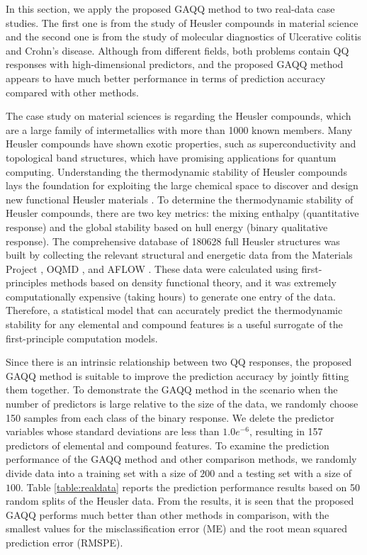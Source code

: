\documentclass[12pt]{article}
\begin{document}
In this section, we apply the proposed GAQQ method to two real-data case studies.
The first one is from the study of Heusler compounds in material science and the second one is from the study of molecular diagnostics of Ulcerative colitis and Crohn's disease.
Although from different fields, both problems contain QQ responses with high-dimensional predictors, and the proposed GAQQ method appears to have much better performance in terms of prediction accuracy compared with other methods.

The case study on material sciences is regarding the Heusler compounds, which are a large family of intermetallics with more than 1000 known members.
Many Heusler compounds have shown exotic properties, such as superconductivity and topological band structures, which have promising applications for quantum computing.
Understanding the thermodynamic stability of Heusler compounds lays the foundation for exploiting the large chemical space to discover and design new functional Heusler materials \citep{liu2016observation}.
To determine the thermodynamic stability of Heusler compounds, there are two key metrics: the mixing enthalpy (quantitative response) and the global stability based on hull energy (binary qualitative response).
The comprehensive database of 180628 full Heusler structures was built by collecting the relevant structural and energetic data from the Materials Project \citep{jain2013commentary}, OQMD \citep{saal2013materials}, and AFLOW \citep{curtarolo2012aflow}.
These data were calculated using first-principles methods based on density functional theory, and it was extremely computationally expensive (taking hours) to generate one entry of the data.
Therefore, a statistical model that can accurately predict the thermodynamic stability for any elemental and compound features is a useful surrogate of the first-principle computation models.

Since there is an intrinsic relationship between two QQ responses, the proposed GAQQ method is suitable to improve the prediction accuracy by jointly fitting them together.
To demonstrate the GAQQ method in the scenario when the number of predictors is large relative to the size of the data, we randomly choose 150 samples from each class of the binary response.
We delete the predictor variables whose standard deviations are less than $1.0e^{-6}$, resulting in 157 predictors of elemental and compound features.
To examine the prediction performance of the GAQQ method and other comparison methods,
we randomly divide data into a training set with a size of $200$ and a testing set with a size of $100$.
Table \ref{table:realdata} reports the prediction performance results based on 50 random splits of the Heusler data.
From the results,
it is seen that the proposed GAQQ performs much better than other methods in comparison, with the smallest values for the misclassification error (ME)
and the root mean squared prediction error (RMSPE).
\end{document}
